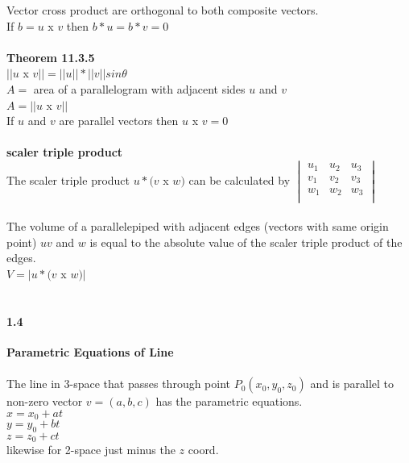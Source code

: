 \documentclass[14pt]{extreport}
\begin{document}
Vector cross product are orthogonal to both composite vectors.\\

If $b = u$ x $v$  then $b * u = b * v = 0$\\\\


\textbf{Theorem 11.3.5}\\
$||u$ x $v|| = ||u||*||v||sin\theta$\\
$A = $ area of a parallelogram with adjacent sides $u$ and $v$\\
$A = ||u $ x $ v||$\\
If $u$ and $v$ are parallel vectors then $u$ x $ v = 0$\\\\

\textbf{scaler triple product}\\

The scaler triple product $u * ( v $ x $ w)$ can be calculated by
$\begin{vmatrix}
u_1 & u_2 & u_3\\
v_1 & v_2 & v_3\\
w_1 & w_2 & w_3\\
\end{vmatrix}$
\\\\

The volume of a parallelepiped with adjacent edges (vectors with same origin point) $u v$ and $w$ is equal to the absolute value of the scaler triple product of the edges.\\

$V = |u * (v $ x $ w)|$\\\\

\paragraph{1.4}\textbf{Parametric Equations of Line}\\\\

The line in 3-space that passes through point $P_0(x_0, y_0, z_0)$ and is parallel to non-zero vector $v = (a, b, c)$ has the parametric equations.\\
$x = x_0 + at$\\
$y = y_0 + bt$\\
$z = z_0 + ct$\\
likewise for 2-space just minus the $z$ coord.\\
\end{document}
